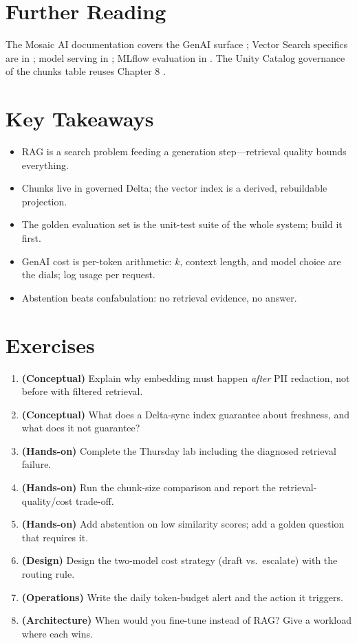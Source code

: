 \section{Further Reading}
The Mosaic AI documentation covers the GenAI surface \cite{databricksMosaicAI}; Vector Search specifics are in \cite{databricksVectorSearch}; model serving in \cite{databricksModelServing}; MLflow evaluation in \cite{mlflowDocs}. The Unity Catalog governance of the chunks table reuses Chapter 8 \cite{databricksUnityCatalog}.

\section*{Key Takeaways}
\begin{itemize}
    \item RAG is a search problem feeding a generation step---retrieval quality bounds everything.
    \item Chunks live in governed Delta; the vector index is a derived, rebuildable projection.
    \item The golden evaluation set is the unit-test suite of the whole system; build it first.
    \item GenAI cost is per-token arithmetic: $k$, context length, and model choice are the dials; log usage per request.
    \item Abstention beats confabulation: no retrieval evidence, no answer.
\end{itemize}

\section{Exercises}
\begin{enumerate}
    \item \textbf{(Conceptual)} Explain why embedding must happen \emph{after} PII redaction, not before with filtered retrieval.
    \item \textbf{(Conceptual)} What does a Delta-sync index guarantee about freshness, and what does it not guarantee?
    \item \textbf{(Hands-on)} Complete the Thursday lab including the diagnosed retrieval failure.
    \item \textbf{(Hands-on)} Run the chunk-size comparison and report the retrieval-quality/cost trade-off.
    \item \textbf{(Hands-on)} Add abstention on low similarity scores; add a golden question that requires it.
    \item \textbf{(Design)} Design the two-model cost strategy (draft vs.\ escalate) with the routing rule.
    \item \textbf{(Operations)} Write the daily token-budget alert and the action it triggers.
    \item \textbf{(Architecture)} When would you fine-tune instead of RAG? Give a workload where each wins.
\end{enumerate}
